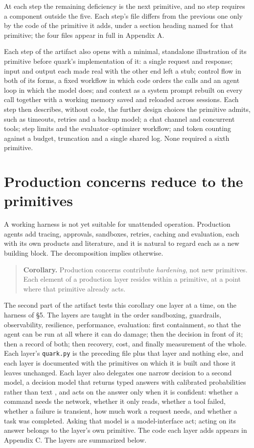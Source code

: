 At each step the remaining deficiency is the next primitive, and no step requires a component outside the five. Each step's file differs from the previous one only by the code of the primitive it adds, under a section heading named for that primitive; the four files appear in full in Appendix A.

Each step of the artifact also opens with a minimal, standalone illustration of its primitive before quark's implementation of it: a single request and response; input and output each made real with the other end left a stub; control flow in both of its forms, a fixed workflow in which code orders the calls and an agent loop in which the model does; and context as a system prompt rebuilt on every call together with a working memory saved and reloaded across sessions. Each step then describes, without code, the further design choices the primitive admits, such as timeouts, retries and a backup model; a chat channel and concurrent tools; step limits and the evaluator--optimizer workflow; and token counting against a budget, truncation and a single shared log. None required a sixth primitive.

\section{Production concerns reduce to the primitives}

A working harness is not yet suitable for unattended operation. Production agents add tracing, approvals, sandboxes, retries, caching and evaluation, each with its own products and literature, and it is natural to regard each as a new building block. The decomposition implies otherwise.

\begin{quote}
\textbf{Corollary.} Production concerns contribute \emph{hardening}, not new primitives. Each element of a production layer resides within a primitive, at a point where that primitive already acts.
\end{quote}

The second part of the artifact tests this corollary one layer at a time, on the harness of §5. The layers are taught in the order sandboxing, guardrails, observability, resilience, performance, evaluation: first containment, so that the agent can be run at all where it can do damage; then the decision in front of it; then a record of both; then recovery, cost, and finally measurement of the whole. Each layer's \passthrough{\lstinline!quark.py!} is the preceding file plus that layer and nothing else, and each layer is documented with the primitives on which it is built and those it leaves unchanged. Each layer also delegates one narrow decision to a second model, a decision model that returns typed answers with calibrated probabilities rather than text \cite{typesafe}, and acts on the answer only when it is confident: whether a command needs the network, whether it only reads, whether a tool failed, whether a failure is transient, how much work a request needs, and whether a task was completed. Asking that model is a model-interface act; acting on its answer belongs to the layer's own primitive. The code each layer adds appears in Appendix C. The layers are summarized below.

